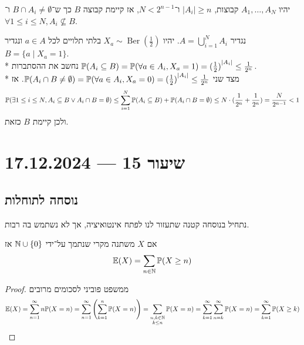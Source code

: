 \begin{example}
	יהיו $A_1, \dots, A_N$ קבוצות, $|A_i| \ge n$ ו־$N < 2^{n - 1}$, אז קיימת קבוצה $B$ כך ש־$B \cap A_i \ne \emptyset$ ו־$\forall 1 \le i \le N, A_i \not\subseteq B$.

	נגדיר $A = \bigcup_{i = 1}^N A_i$.
	יהיו $X_a \sim \operatorname{Ber}(\frac{1}{2})$ בלתי תלויים לכל $a \in A$ ונגדיר $B = \{ a \mid X_a = 1 \}$. \\*
	נחשב את ההסתברות $\mathbb{P}(A_i \subseteq B) = \mathbb{P}(\forall a \in A_i, X_a = 1) = {(\frac{1}{2})}^{|A_i|} \le \frac{1}{2^n}$. \\*
	מצד שני $\mathbb{P}(A_i \cap B \ne \emptyset) = \mathbb{P}(\forall a \in A_i, X_a = 0) = {(\frac{1}{2})}^{|A_i|} \le \frac{1}{2^n}$.
	אז
	\[
		\mathbb{P}(\exists 1 \le i \le N, A_i \subseteq B \lor A_i \cap B = \emptyset)
		\le \sum_{i = 1}^{N} \mathbb{P}(A_i \subseteq B) + \mathbb{P}(A_i \cap B = \emptyset)
		\le N \cdot (\frac{1}{2^n} + \frac{1}{2^n})
		= \frac{N}{2^{n - 1}}
		< 1
	\]
	ולכן קיימת $B$ כזאת.
\end{example}

\section{שיעור 15 --- 17.12.2024}

\subsection{נוסחה לתוחלות}
נתחיל בנוסחה קטנה שתעזור לנו לפתח אינטואיציה, אך לא נשתמש בה רבות.
\begin{proposition}
	אם $X$ משתנה מקרי שנתמך על־ידי $\mathbb{N} \cup \{0\}$ אז
	\[
		\mathbb{E}(X) = \sum_{n \in \mathbb{N}} \mathbb{P}(X \ge n)
	\]
\end{proposition}
\begin{proof}
	ממשפט פוביני לסכומים מרובים
	\[
		\mathbb{E}(X)
		= \sum_{n = 1}^\infty n \mathbb{P}(X = n)
		= \sum_{n = 1}^\infty \left( \sum_{k = 1}^n \mathbb{P}(X = n) \right)
		= \sum_{\substack{n, k \in \mathbb{N} \\ k \le n}} \mathbb{P}(X = n)
		= \sum_{k = 1}^\infty \sum_{n = k}^\infty \mathbb{P}(X = n)
		= \sum_{k = 1}^\infty \mathbb{P}(X \ge k)
	\]
\end{proof}

